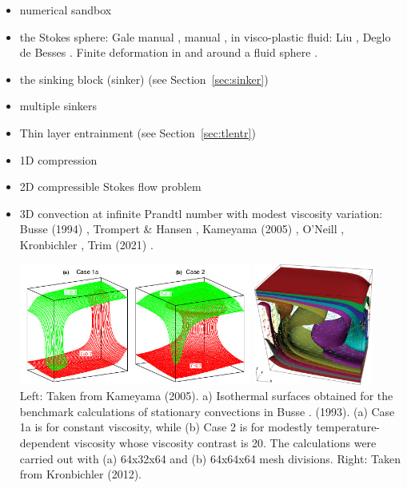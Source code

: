 \begin{itemize}
\item numerical sandbox \cite{bube06,bube06,maie12,busa16,gltf18}
\item the Stokes sphere: Gale manual \cite{galemanual}, \aspect{} manual \cite{aspectmanual}, 
                         in visco-plastic fluid: Liu \etal \cite{limd02}, Deglo de Besses \etal \cite{demj04}. 
      Finite deformation in and around a fluid sphere \cite{sccm88,crud88}.
\item the sinking block (sinker) \cite{thie11,cehg14,gery10,geyu03,mamo08,mishin11,fumt11,maie12,sctc20} 
      (see Section~\ref{sec:sinker})
\item multiple sinkers \cite{mabl14,mabl15,clhe21}
\item Thin layer entrainment (see Section~\ref{sec:tlentr})
\item 1D compression \cite{modm02}
\item 2D compressible Stokes flow problem \cite{itki94,tagu07,lezh08,kilv10,lizh13}
\item 3D convection at infinite Prandtl number with modest viscosity variation:
      Busse \etal (1994) \cite{bucc94},
      Trompert \& Hansen \cite{trha98},
      Kameyama \etal (2005) \cite{kaks05},
      O'Neill \etal \cite{onmm06},
      Kronbichler \etal \cite{krhb12}, Trim \etal (2021) \cite{trbs21}.

      \begin{center}
      \includegraphics[height=4cm]{images/busse93/kaks05}
      \includegraphics[height=4cm]{images/busse93/krhb12}\\
      {\captionfont Left: Taken from Kameyama \etal (2005).
      a) Isothermal surfaces obtained for the benchmark calculations 
      of stationary convections in Busse \etal. (1993). (a) Case 1a is for
      constant viscosity, while (b) Case 2 is for modestly temperature-dependent 
      viscosity whose viscosity contrast is 20. The calculations
      were carried out with (a) 64x32x64 and (b) 64x64x64 mesh divisions.
      Right: Taken from Kronbichler \etal (2012).}
      \end{center}


\end{itemize}
